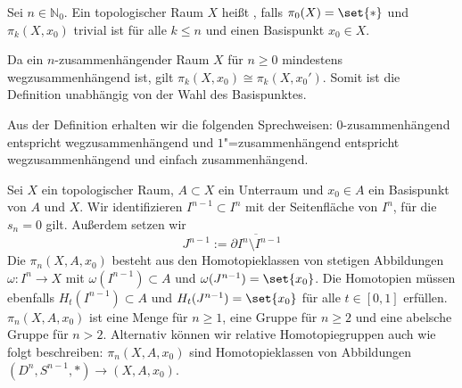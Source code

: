 \begin{definition}[{name=[{n-zusammenhängender Raum}]}]
	Sei $n \in \mathbb{N}_0$. 
	Ein topologischer Raum $X$ heißt , falls $\pi_0(X)=\set{*}$ und $\pi_k(X,x_0)$ trivial ist für alle $k \le n$ und einen Basispunkt $x_0 \in X$.
\end{definition}

\begin{bemerkung}[{name=[Abhängigkeit von der Wahl eines Basispunktes]}]
	Da ein $n$-zusammenhängender Raum $X$ für $n \ge 0$ mindestens wegzusammenhängend ist, gilt $\pi_k(X,x_0) \cong \pi_k(X,x_0')$. 
	Somit ist die Definition unabhängig von der Wahl des Basispunktes.
\end{bemerkung}

Aus der Definition erhalten wir die folgenden Sprechweisen: $0$-zusammenhängend entspricht wegzusammenhängend und $1$"=zusammenhängend entspricht wegzusammenhängend und einfach zusammenhängend.

\begin{definition}[{name=[Relative Homotopiegruppen]}]
	Sei $X$ ein topologischer Raum, $A \subset X$ ein Unterraum und $x_0 \in A$ ein Basispunkt von $A$ und $X$. 
	Wir identifizieren $I^{n-1} \subset I^n$ mit der Seitenfläche von $I^n$, für die $s_n=0$ gilt. Außerdem setzen wir 
	\[
		J^{n-1} := \overline{\partial I^n \setminus I^{n-1}}
	\]
	Die  $\pi_n(X,A,x_0)$ besteht aus den Homotopieklassen von stetigen Abbildungen $\omega\colon I^n  \to X$ mit $\omega(I^{n-1}) \subset A$ und $\omega(J^{n-1})=\set{x_0}$. 
	Die Homotopien müssen ebenfalls $H_t(I^{n-1}) \subset A$ und $H_t(J^{n-1}) =\set{x_0}$ für alle $t \in [0,1]$ erfüllen.
	$\pi_n(X,A,x_0)$ ist eine Menge für $n \ge 1$, eine Gruppe für $n \ge 2$ und eine abelsche Gruppe für $n > 2$. 
	Alternativ können wir relative Homotopiegruppen auch wie folgt beschreiben: $\pi_n(X,A,x_0)$ sind Homotopieklassen von Abbildungen $(D^n,S^{n-1},*) \to (X,A,x_0)$.
\end{definition}

